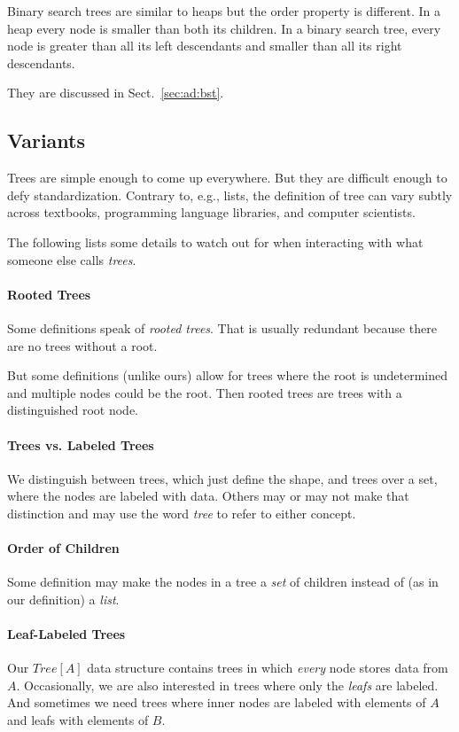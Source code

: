 Binary search trees are similar to heaps but the order property is different.
In a heap every node is smaller than both its children.
In a binary search tree, every node is greater than all its left descendants and smaller than all its right descendants.

They are discussed in Sect.~\ref{sec:ad:bst}.

\subsection{Variants}

Trees are simple enough to come up everywhere.
But they are difficult enough to defy standardization.
Contrary to, e.g., lists, the definition of tree can vary subtly across textbooks, programming language libraries, and computer scientists.

The following lists some details to watch out for when interacting with what someone else calls \emph{trees}.

\paragraph{Rooted Trees}
Some definitions speak of \emph{rooted trees}.
That is usually redundant because there are no trees without a root.

But some definitions (unlike ours) allow for trees where the root is undetermined and multiple nodes could be the root.
Then rooted trees are trees with a distinguished root node.

\paragraph{Trees vs. Labeled Trees}
We distinguish between trees, which just define the shape, and trees over a set, where the nodes are labeled with data.
Others may or may not make that distinction and may use the word \emph{tree} to refer to either concept.

\paragraph{Order of Children}
Some definition may make the nodes in a tree a \emph{set} of children instead of (as in our definition) a \emph{list}.

\paragraph{Leaf-Labeled Trees}
Our $Tree[A]$ data structure contains trees in which \emph{every} node stores data from $A$.
Occasionally, we are also interested in trees where only the \emph{leafs} are labeled.
And sometimes we need trees where inner nodes are labeled with elements of $A$ and leafs with elements of $B$.

